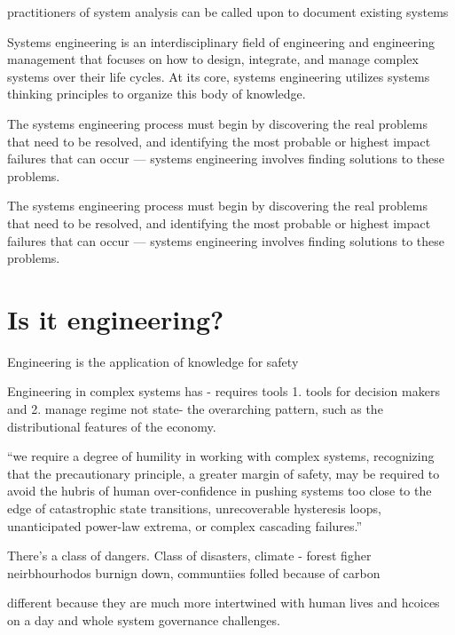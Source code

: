 practitioners of system analysis can be called upon to document existing systems 

Systems engineering is an interdisciplinary field of engineering and engineering management that focuses on how to design, integrate, and manage complex systems over their life cycles. At its core, systems engineering utilizes systems thinking principles to organize this body of knowledge. 

The systems engineering process must begin by discovering the real problems that need to be resolved, and identifying the most probable or highest impact failures that can occur — systems engineering involves finding solutions to these problems. 

The systems engineering process must begin by discovering the real problems that need to be resolved, and identifying the most probable or highest impact failures that can occur — systems engineering involves finding solutions to these problems. 


\section{Is it engineering?}

Engineering is the application of knowledge for safety \cite{ontarioProfessionalEngineersAct1990}

Engineering in complex systems has - requires tools
1. tools for decision makers and 
2. manage regime not state- the overarching pattern, such as the distributional features of the economy. 


``we require a degree of humility in working with complex systems, recognizing that the precautionary principle, a greater margin of safety, may be required to avoid the hubris of human over-confidence in pushing systems too close to the edge of catastrophic state transitions, unrecoverable hysteresis loops, unanticipated power-law extrema, or complex cascading failures.'' 


There's a class of dangers.
Class of disasters, climate - forest figher
neirbhourhodos burnign down, communtiies folled because of carbon

different because they are much more intertwined with human lives and hcoices on a day 
and whole system governance challenges.


